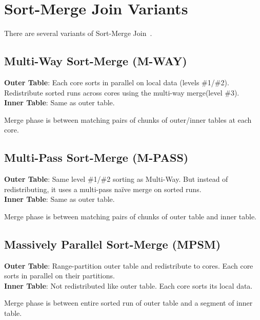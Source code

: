 \documentclass[11pt]{article}
\begin{document}
\section{Sort-Merge Join Variants}
There are several variants of Sort-Merge Join~\cite{Balkesen2013}.

\subsection*{Multi-Way Sort-Merge (M-WAY)}
\textbf{Outer Table}: Each core sorts in parallel on local data (levels \#1/\#2). Redistribute sorted runs across cores using the multi-way merge(level \#3). \\
\textbf{Inner Table}: Same as outer table.

Merge phase is between matching pairs of chunks of outer/inner tables at each core.

\subsection*{Multi-Pass Sort-Merge (M-PASS)}
\textbf{Outer Table}: Same level \#1/\#2 sorting as Multi-Way. But instead of redistributing, it uses a multi-pass naïve merge on sorted runs. \\
\textbf{Inner Table}: Same as outer table.

Merge phase is between matching pairs of chunks of outer table and inner table.

\subsection*{Massively Parallel Sort-Merge (MPSM)}
\textbf{Outer Table}: Range-partition outer table and redistribute to cores. Each core sorts in parallel on their partitions. \\
\textbf{Inner Table}: Not redistributed like outer table. Each core sorts its local data.

Merge phase is between entire sorted run of outer table and a segment of inner table.


\newpage


\end{document}
